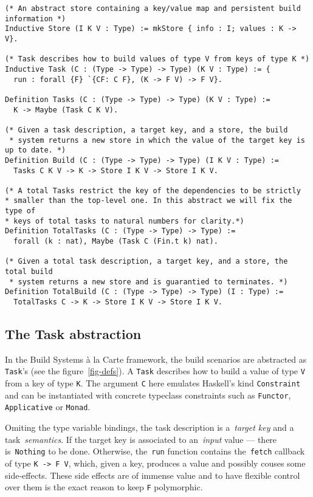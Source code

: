 \documentclass[sigplan,review]{acmart}\settopmatter{printfolios=true,printccs=false,printacmref=false}
\newcommand{\hs}{\texttt}
\newcommand{\coq}{\texttt}
\begin{document}
\begin{figure*}[t]
\begin{verbatim}
(* An abstract store containing a key/value map and persistent build information *)
Inductive Store (I K V : Type) := mkStore { info : I; values : K -> V}.

(* Task describes how to build values of type V from keys of type K *)
Inductive Task (C : (Type -> Type) -> Type) (K V : Type) := {
  run : forall {F} `{CF: C F}, (K -> F V) -> F V}.

Definition Tasks (C : (Type -> Type) -> Type) (K V : Type) :=
  K -> Maybe (Task C K V).

(* Given a task description, a target key, and a store, the build
 * system returns a new store in which the value of the target key is up to date. *)
Definition Build (C : (Type -> Type) -> Type) (I K V : Type) :=
  Tasks C K V -> K -> Store I K V -> Store I K V.

(* A total Tasks restrict the key of the dependencies to be strictly
* smaller than the top-level one. In this abstract we will fix the type of
* keys of total tasks to natural numbers for clarity.*)
Definition TotalTasks (C : (Type -> Type) -> Type) :=
  forall (k : nat), Maybe (Task C (Fin.t k) nat).

(* Given a total task description, a target key, and a store, the total build
 * system returns a new store and is guarantied to terminates. *)
Definition TotalBuild (C : (Type -> Type) -> Type) (I : Type) :=
  TotalTasks C -> K -> Store I K V -> Store I K V.
\end{verbatim}
\caption{Definitions of key build systems abstractions.}\label{fig-defs}
\end{figure*}

\subsection{The Task abstraction}

In the Build Systems \`a la Carte framework, the build scenarios are abstracted
as \hs{Task}'s (see the figure~\ref{fig-defs}). A \hs{Task}
describes how to build a value of type \hs{V} from a key of type \hs{K}.
The argument \hs{C} here emulates Haskell's kind \hs{Constraint} and can be
instantiated with concrete typeclass constraints such as \hs{Functor},
\hs{Applicative} or \hs{Monad}.

Omiting the type variable bindings, the task description is a~\emph{target key}
and a task~\emph{semantics}. If the target key is associated to an~\emph{input}
value --- there is~\coq{Nothing} to be done. Otherwise, the~\coq{run} function
contains the~\coq{fetch} callback of type \coq{K -> F V}, which, given a key,
produces a value and possibly couses some side-effects. These side effects are
of immense value and to have flexible control over them is the exact reason to
keep \coq{F} polymorphic.
\end{document}

